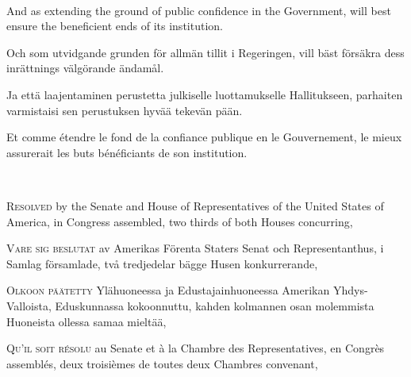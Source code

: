 \documentclass[a4,landscape,12pt]{article}
\begin{document}
~

\begin{minipage}[t]{0.22\textwidth}
And as extending the ground of public confidence in the Government, will best ensure the beneficient ends of its institution.
\end{minipage}\textwidth
\begin{minipage}[t]{0.22\textwidth}
Och som utvidgande grunden för allmän tillit i Regeringen, vill bäst försäkra dess inrättnings välgörande ändamål.
\end{minipage}\textwidth
\begin{minipage}[t]{0.22\textwidth}
Ja että laajentaminen perustetta julkiselle luottamukselle Hallitukseen, parhaiten varmistaisi sen perustuksen hyvää tekevän pään.
\end{minipage}\textwidth
\begin{minipage}[t]{0.22\textwidth}
Et comme étendre le fond de la confiance publique en le Gouvernement, le mieux assurerait les buts bénéficiants de son institution.
\end{minipage}

~

\begin{minipage}[t]{0.22\textwidth}
\textsc{Resolved} by the Senate and House of Representatives of the United States of America, in Congress assembled, two thirds of both Houses concurring,
\end{minipage}\textwidth
\begin{minipage}[t]{0.22\textwidth}
\textsc{Vare sig beslutat} av Amerikas Förenta Staters Senat och Representanthus, i Samlag församlade, två tredjedelar bägge Husen konkurrerande,
\end{minipage}\textwidth
\begin{minipage}[t]{0.22\textwidth}
\textsc{Olkoon päätetty} Ylähuoneessa ja Edustajainhuoneessa Amerikan Yhdys-Valloista, Eduskunnassa kokoonnuttu, kahden kolmannen osan molemmista Huoneista ollessa samaa mieltää,
\end{minipage}\textwidth
\begin{minipage}[t]{0.22\textwidth}
\textsc{Qu'il soit résolu} au Senate et à la Chambre des Representatives, en Congrès assemblés, deux troisièmes de toutes deux Chambres convenant,
\end{minipage}
\end{document}

